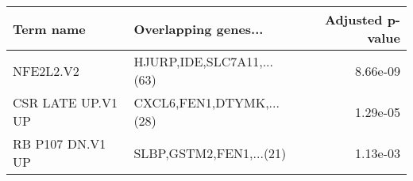 \begin{tabular}{llr}
\toprule
        Term name &      Overlapping genes... &  Adjusted p-value \\
\midrule
        NFE2L2.V2 & HJURP,IDE,SLC7A11,...(63) &          8.66e-09 \\
CSR LATE UP.V1 UP &  CXCL6,FEN1,DTYMK,...(28) &          1.29e-05 \\
 RB P107 DN.V1 UP &   SLBP,GSTM2,FEN1,...(21) &          1.13e-03 \\
\bottomrule
\end{tabular}

